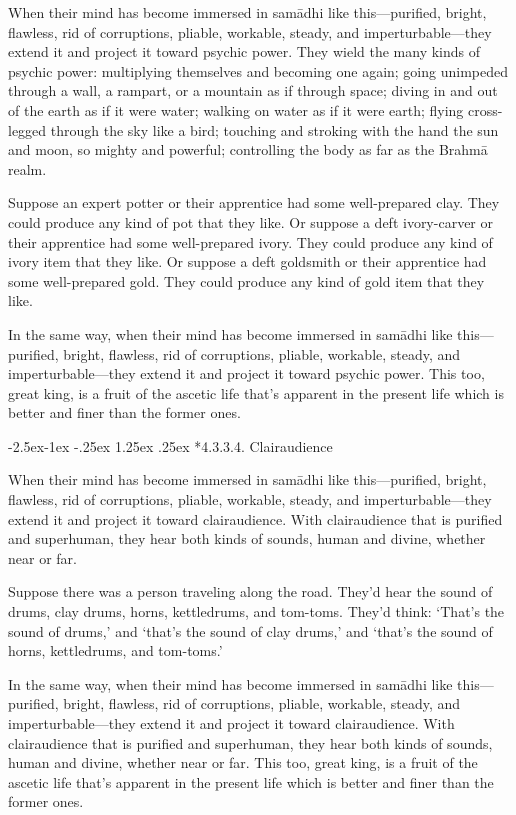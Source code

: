 \documentclass[12pt,openany]{book}%
\makeatletter
\renewcommand\paragraph{\@startsection{paragraph}{4}{\z@}%
            {-2.5ex\@plus -1ex \@minus -.25ex}%
            {1.25ex \@plus .25ex}%
            {\noindent\Semiboldnormalfont\normalsize}}
\makeatother
\begin{document}
When their mind has become immersed in \textsanskrit{samādhi} like this—purified, bright, flawless, rid of corruptions, pliable, workable, steady, and imperturbable—they extend it and project it toward psychic power. They wield the many kinds of psychic power: multiplying themselves and becoming one again; going unimpeded through a wall, a rampart, or a mountain as if through space; diving in and out of the earth as if it were water; walking on water as if it were earth; flying cross-legged through the sky like a bird; touching and stroking with the hand the sun and moon, so mighty and powerful; controlling the body as far as the \textsanskrit{Brahmā} realm. 

Suppose an expert potter or their apprentice had some well-prepared clay. They could produce any kind of pot that they like. Or suppose a deft ivory-carver or their apprentice had some well-prepared ivory. They could produce any kind of ivory item that they like. Or suppose a deft goldsmith or their apprentice had some well-prepared gold. They could produce any kind of gold item that they like. 

In the same way, when their mind has become immersed in \textsanskrit{samādhi} like this—purified, bright, flawless, rid of corruptions, pliable, workable, steady, and imperturbable—they extend it and project it toward psychic power. This too, great king, is a fruit of the ascetic life that’s apparent in the present life which is better and finer than the former ones. 

\paragraph*{4.3.3.4. Clairaudience }

When their mind has become immersed in \textsanskrit{samādhi} like this—purified, bright, flawless, rid of corruptions, pliable, workable, steady, and imperturbable—they extend it and project it toward clairaudience. With clairaudience that is purified and superhuman, they hear both kinds of sounds, human and divine, whether near or far. 

Suppose there was a person traveling along the road. They’d hear the sound of drums, clay drums, horns, kettledrums, and tom-toms. They’d think: ‘That’s the sound of drums,’ and ‘that’s the sound of clay drums,’ and ‘that’s the sound of horns, kettledrums, and tom-toms.’ 

In the same way, when their mind has become immersed in \textsanskrit{samādhi} like this—purified, bright, flawless, rid of corruptions, pliable, workable, steady, and imperturbable—they extend it and project it toward clairaudience. With clairaudience that is purified and superhuman, they hear both kinds of sounds, human and divine, whether near or far. This too, great king, is a fruit of the ascetic life that’s apparent in the present life which is better and finer than the former ones. 
\end{document}
